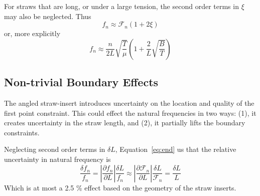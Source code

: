 \documentclass[twoside]{article}
\begin{document}
\begin{multicols}{2}
For straws that are long, or under a large tension, the second order terms in $\xi$ may also be neglected. Thus
 \begin{equation}
 \boxed{
 	f_n \approx \mathcal{F}_n (1 + 2\xi )
 }
 \end{equation}
 or, more explicitly 
  \begin{equation}
  f_n \approx  \frac{n}{2L}\sqrt{\frac{T}{\mu}}  (1 + \frac{2}{L}  \sqrt{\frac{B}{T}} )
 \label{eq:end}
  \end{equation}




\subsection{Non-trivial Boundary Effects}
\label{sec:boun}
The angled straw-insert introduces uncertainty on the location and quality of the first point constraint.  This could effect the natural frequencies in two ways: (1), it creates uncertainty in the straw length, and (2), it partially lifts the boundary constraints.

Neglecting second order terms in $\delta L$, Equation~\ref{eq:end} us that the relative uncertainty in natural frequency is
\begin{equation}
\frac{\delta f_n}{f_n} =|\frac{\partial f_n}{\partial L}| \frac{\delta L}{f_n} \approx |\frac{\partial \mathcal{F}_n}{\partial L}|\frac{\delta L}{\mathcal{F}_n} = \frac{\delta L}{L}
\end{equation} 
Which is at most a 2.5 \% effect based on the geometry of the straw inserts.


\end{multicols}
\end{document}
